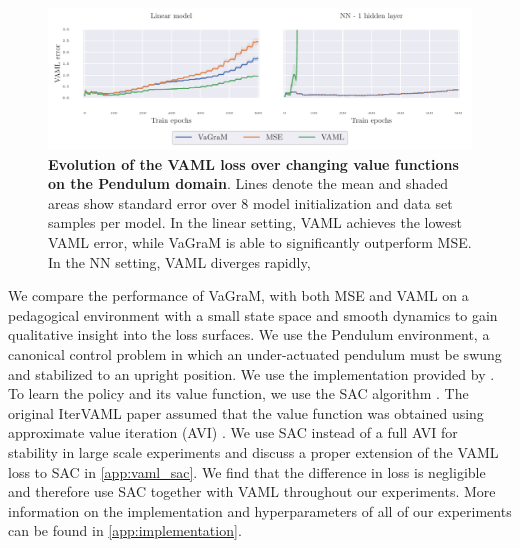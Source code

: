 \begin{figure}[t]
\begin{center}
\includegraphics[width=\linewidth]{figures/vagram/pendulum_joint.pdf}
\end{center}
\caption{\textbf{Evolution of the VAML loss over changing value functions on the Pendulum domain}. Lines denote the mean and shaded areas show standard error over 8 model initialization and data set samples per model. In the linear setting, VAML achieves the lowest VAML error, while VaGraM is able to significantly outperform MSE. In the NN setting, VAML diverges rapidly, }
\label{fig:iterated_pendulum_training}
\end{figure}

We compare the performance of VaGraM, with both MSE and VAML on a pedagogical environment with a small state space and smooth dynamics to gain qualitative insight into the loss surfaces. 
We use the Pendulum environment, a canonical control problem in which an under-actuated pendulum must be swung and stabilized to an upright position.
We use the implementation provided by \cite{brockman2016openai}.
To learn the policy and its value function, we use the SAC algorithm \parencite{sac}.
The original IterVAML paper assumed that the value function was obtained using approximate value iteration (AVI) \parencite{gordon1995stable,ernst2005tree,farahmand2010error}. We use SAC instead of a full AVI for stability in large scale experiments and discuss a proper extension of the VAML loss to SAC in \autoref{app:vaml_sac}. We find that the difference in loss is negligible and therefore use SAC together with VAML throughout our experiments.
More information on the implementation and hyperparameters of all of our experiments can be found in \autoref{app:implementation}. 

